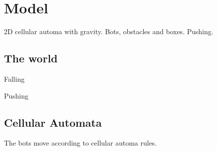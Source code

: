 \section{Model}
\label{sec:model}

2D cellular automa with gravity. Bots, obstacles and boxes. Pushing.

\subsection{The world}
Falling

Pushing

\subsection{Cellular Automata}
The bots move according to cellular automa rules.

